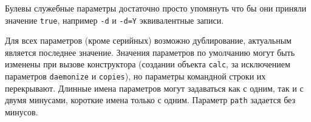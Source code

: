 Булевы служебные параметры достаточно просто упомянуть что бы они приняли значение \verb'true', например \verb'-d' и \verb'-d=Y' эквивалентные записи.

Для всех параметров (кроме серийных) возможно дублирование, актуальным является 
последнее значение. Значения параметров по умолчанию могут быть изменены при вызове 
конструктора (создании объекта  \verb'calc', за исключением параметров \verb'daemonize' и \verb'copies'), но параметры 
командной строки их перекрывают. Длинные имена параметров 
могут задаваться как с одним, так и с двумя минусами, короткие имена
только с одним. Параметр \verb'path' задается без минусов.

